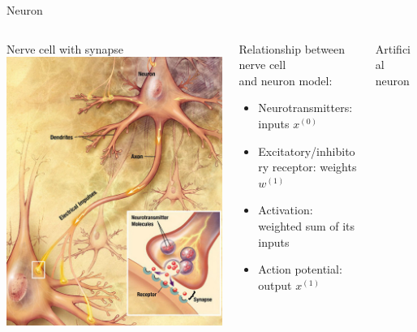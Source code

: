 \documentclass{beamer}
\begin{document}
\begin{frame}{Neuron}
\begin{columns}[onlytextwidth]
\begin{column}{0.3\textwidth}
\centering
\footnotesize Nerve cell with synapse\\[0.5em]
\includegraphics[width=\textwidth]{images/neuron1}
\end{column}
\begin{column}{0.45\textwidth}
\footnotesize \hspace{0.8em}Relationship between nerve cell\\\hspace{0.8em}and
neuron model:
\begin{itemize}
\item Neurotransmitters: inputs $x^{(0)}$ 
\item Excitatory/inhibitory receptor: weights $w^{(1)}$
\item Activation: weighted sum of its inputs
\item Action potential: output $x^{(1)}$
\end{itemize}
\end{column}
\begin{column}{0.25\textwidth}
\centering
\footnotesize Artificial neuron\\[0.5em]
\end{column}
\end{columns}
\end{frame}
\end{document}
